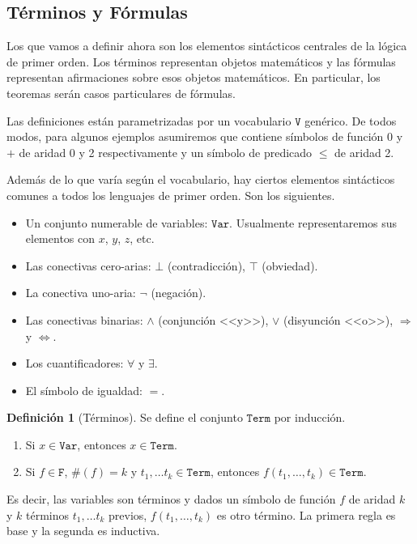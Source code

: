 \documentclass[a4paper, 12pt]{report}
\newcommand{\Ra}{\Rightarrow}
\newcommand{\Lra}{\Leftrightarrow}
\theoremstyle{definition}
\newtheorem{definicion}[teorema]{Definición}
\begin{document}
\subsection{Términos y Fórmulas}

Los que vamos a definir ahora son los elementos sintácticos centrales de la lógica de primer orden. Los términos representan objetos matemáticos y las fórmulas representan afirmaciones sobre esos objetos matemáticos. En particular, los teoremas serán casos particulares de fórmulas.

Las definiciones están parametrizadas por un vocabulario $\mathtt{V}$ genérico. De todos modos, para algunos ejemplos asumiremos que contiene símbolos de función $0$ y $+$ de aridad 0 y 2 respectivamente y un símbolo de predicado $\leq$ de aridad 2.

Además de lo que varía según el vocabulario, hay ciertos elementos sintácticos comunes a todos los lenguajes de primer orden. Son los siguientes.
\begin{itemize}
	\item Un conjunto numerable de variables: $\mathtt{Var}$. Usualmente representaremos sus elementos con $x$, $y$, $z$, etc.
	\item Las conectivas cero-arias: $\bot$ (contradicción), $\top$ (obviedad).
	\item La conectiva uno-aria: $\lnot$ (negación).
	\item Las conectivas binarias: $\wedge$ (conjunción <<y>>), $\vee$ (disyunción <<o>>),  $\Ra$ y $\Lra$.
	\item Los cuantificadores: $\forall$ y $\exists$.
	\item El símbolo de igualdad: $=$.
\end{itemize}

\begin{definicion}[Términos]
	Se define el conjunto $\mathtt{Term}$ por inducción.
	\begin{enumerate}
		\item Si $x\in\mathtt{Var}$, entonces $x\in\mathtt{Term}$.
		\item Si $f\in\mathtt{F}$, $\#(f)=k$ y $t_1,\dots t_k\in\mathtt{Term}$, entonces $f(t_1,\dots,t_k)\in\mathtt{Term}$.
	\end{enumerate}
	Es decir, las variables son términos y dados un símbolo de función $f$ de aridad $k$ y $k$ términos $t_1,\dots t_k$ previos, $f(t_1,\dots,t_k)$ es otro término. La primera regla es base y la segunda es inductiva.
\end{definicion}
\end{document}

